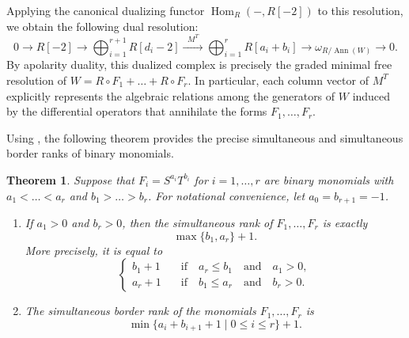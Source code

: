 \documentclass[a4paper, 11pt]{amsart}
\newtheorem{theorem}{Theorem}
\numberwithin{theorem}{section}
\theoremstyle{definition}
\numberwithin{equation}{section}
\DeclareMathOperator{\Ann}{\operatorname{Ann}}
\DeclareMathOperator{\Hom}{\operatorname{Hom}}
\begin{document}
Applying the canonical dualizing functor $\Hom_R(-, R[-2])$ to this resolution, we obtain the following dual resolution:
\[
0 \longrightarrow R[-2] \longrightarrow \bigoplus_{i=1}^{r+1} R[d_i-2] \xrightarrow{\;\; M^T \;\;} \bigoplus_{i=1}^r R[a_i+b_i] \longrightarrow \omega_{R/\Ann(W)} \longrightarrow 0.
\]
By apolarity duality, this dualized complex is precisely the graded minimal free resolution of $W = R \circ F_1 + \dots + R \circ F_r$.
In particular, each column vector of $M^T$ explicitly represents the algebraic relations among the generators of $W$ induced by the differential operators that annihilate the forms $F_1, \dots, F_r$.

Using , the following theorem provides the precise simultaneous and simultaneous border ranks of binary monomials.
\begin{theorem}\label{thm:monomialrank}
Suppose that $F_i = S^{a_i}T^{b_i}$ for $i = 1, \dots, r$ are binary monomials with $a_1 < \dots < a_r$ and $b_1 > \dots > b_r$.
For notational convenience, let $a_0 = b_{r+1} = -1$.
\begin{enumerate}
    \item\label{prop:monomialhonestrank} 
    If $a_1 > 0$ and $b_r > 0$, then the simultaneous rank of $F_1, \dots, F_r$ is exactly 
    \[
    \max\{b_1, a_r\} + 1.
    \]
    More precisely, it is equal to
    \[
    \begin{cases}
        b_1+1 &\quad\text{if}\quad a_r \leq b_1 \quad\text{and}\quad a_1 > 0, \\
        a_r+1 &\quad\text{if}\quad b_1 \leq a_r \quad\text{and}\quad b_r > 0.
    \end{cases}
    \]
    \item\label{prop:monomialborderrank} The simultaneous border rank of the monomials $F_1,\dots,F_r$ is 
    \[
    \min\{a_i+b_{i+1}+1 \mid 0\leq i\leq r\}+1.
    \]
\end{enumerate}
\end{theorem}
\end{document}
